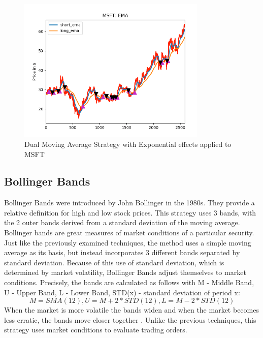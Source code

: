 \documentclass[letterpaper,11pt]{article}
\begin{document}
\begin{figure}[h]
\centering
\includegraphics[width=90mm]{EMA_MSFT.png}
\caption{Dual Moving Average Strategy with Exponential effects applied to MSFT \label{overflow}}
\label{EMAfigure}
\end{figure}

\subsection{Bollinger Bands}

Bollinger Bands were introduced by John Bollinger in the 1980s\cite{Liu2006}. They provide a relative definition for high and low stock prices. This strategy uses 3 bands, with the 2 outer bands derived from a standard deviation of the moving average. Bollinger bands are great measures of market conditions of a particular security. Just like the previously examined techniques, the method uses a simple moving average as its basis, but instead incorporates 3 different bands separated by standard deviation. Because of this use of standard deviation, which is determined by market volatility, Bollinger Bands adjust themselves to market conditions. Precisely, the bands are calculated as follows with M - Middle Band, U - Upper Band, L - Lower Band, STD(x) - standard deviation of period x: \[M = SMA(12), U = M + 2 * STD(12),  L = M - 2 * STD(12)\] When the market is more volatile the bands widen and when the market becomes less erratic, the bands move closer together \cite{Liu2006}. Unlike the previous techniques, this strategy uses market conditions to evaluate trading orders.
\end{document}
